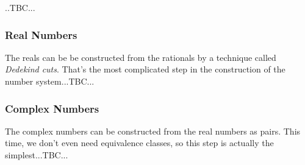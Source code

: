 ..TBC...

\subsubsection{Real Numbers} The reals can be be constructed from the rationals by a technique called \emph{Dedekind cuts}. That's the most complicated step in the construction of the number system...TBC...






\subsubsection{Complex Numbers} The complex numbers can be constructed from the real numbers as pairs. This time, we don't even need equivalence classes, so this step is actually the simplest...TBC...







